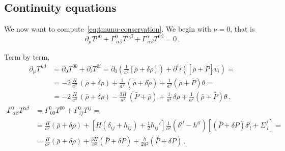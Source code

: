 \subsection{Continuity equations}
We now want to compute~\eqref{eq:tmunu-conservation}. We begin with $\nu = 0$, that is
\begin{equation}
    \partial_\mu T^{\mu 0}+\Gamma_{\ \alpha \beta}^0 T^{\alpha \beta}+
    \Gamma_{\ \alpha \beta}^\alpha T^{0 \beta}=0\, .
\end{equation}

Term by term,
\begin{align}
    \nonumber
    \partial_\mu T^{\mu 0} &= \partial_0 T^{00} + \partial_i T^{0i} = 
    \partial_0 \left(\frac{1}{a^2}[\bar{\rho}+\delta\rho]\right) + \partial^ii\left([\bar{\rho}+\bar{P}]v_i\right) = \\ &= \nonumber
    -2\, \frac{H}{a^2}\, (\bar{\rho}+\delta\rho) + \frac{1}{a^2}\, (\dot{\bar{\rho}}+\delta\dot{\rho}) + \frac{1}{a^2}(\bar{\rho}+\bar{P})\theta = \\ &=
    -2\, \frac{H}{a^2}\, (\bar{\rho}+\delta\rho) - \frac{3H}{a^2}\, (\bar{P}+\bar{\rho}) + \frac{1}{a^2}\, \delta\dot{\rho} + \frac{1}{a^2}(\bar{\rho}+\bar{P})\theta\, .
\end{align}
\begin{align}
    \nonumber
    \Gamma^0_{\ \alpha\beta}T^{\alpha\beta} &= \Gamma^0_{\ 00}T^{00} + \Gamma^0_{\ ij}T^{ij} = \\ &=
    \nonumber
    \frac{H}{a^2}(\bar{\rho}+\delta\rho) + \left[H(\delta_{ij} + h_{ij}) + \frac{1}{2}h_{ij}'\right]\frac{1}{a^2}(\delta^{il}-h^{il})\left[(\bar{P}+\delta P)\delta^j_{\ l} + \Sigma^j_{\ l}\right] = \\ &=
    \frac{H}{a^2}(\bar{\rho}+\delta\rho) + \frac{3H}{a^2}(\bar{P}+\delta P) + \frac{\dot{h}}{2a^2}(\bar{P}+\delta P)\, .
\end{align}
